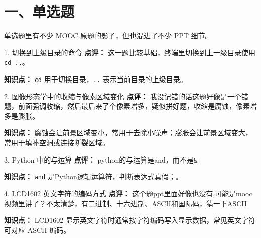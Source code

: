 
\begin{abstract}
这次考试之前，原本以为试卷会比较依赖 MOOC 原题，真正考出来以后才发现全是PPT 里的概念。所以历年的试卷和mooc其实参考价值很小，除了大题以外。
\end{abstract}

\section{一、单选题}

单选题里有不少 MOOC 原题的影子，但也混进了不少 PPT 细节。

\begin{question}{1. 切换到上级目录的命令}
\textbf{点评：} 这一题比较基础，终端里切换到上一级目录使用 \texttt{cd ..}。

\textbf{知识点：} \texttt{cd} 用于切换目录，\texttt{..} 表示当前目录的上级目录。
\end{question}

\begin{question}{2. 图像形态学中的收缩与像素区域变化}
\textbf{点评：} 我没记错的话这题好像是一个错题，前面强调收缩，然后最后来了个像素增多，疑似拼好题，收缩是腐蚀，像素增多是膨胀。

\textbf{知识点：} 腐蚀会让前景区域变小，常用于去除小噪声；膨胀会让前景区域变大，常用于填补空洞或连接断裂区域。
\end{question}

\begin{question}{3. Python 中的与运算}
\textbf{点评：} python的与运算是and，而不是\texttt{\&}

\textbf{知识点：} \texttt{and} 是Python逻辑运算符，判断表达式真假；。
\end{question}

\begin{question}{4. LCD1602 英文字符的编码方式}
\textbf{点评：} 这个题ppt里面好像也没有,可能是mooc视频里讲了？不太清楚，有二进制、十六进制、ASCII和国际码，猜一下ASCII

\textbf{知识点：} LCD1602 显示英文字符时通常按字符编码写入显示数据，常见英文字符可对应 ASCII 编码。
\end{question}

